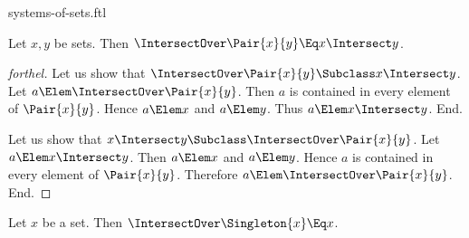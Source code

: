 \documentclass{stex}
\begin{document}
\begin{smodule}{systems-of-sets.ftl}
\begin{proposition*}[forthel]
  Let $x, y$ be sets.
  Then $\IntersectOver \Pair{x}{y} \Eq x \Intersect y$.
\end{proposition*}
\begin{proof}[forthel]
  Let us show that $\IntersectOver \Pair{x}{y} \Subclass x \Intersect y$.
    Let $a \Elem \IntersectOver \Pair{x}{y}$.
    Then $a$ is contained in every element of $\Pair{x}{y}$.
    Hence $a \Elem x$ and $a \Elem y$.
    Thus $a \Elem x \Intersect y$.
  End.

  Let us show that $x \Intersect y \Subclass \IntersectOver \Pair{x}{y}$.
    Let $a \Elem x \Intersect y$.
    Then $a \Elem x$ and $a \Elem y$.
    Hence $a$ is contained in every element of $\Pair{x}{y}$.
    Therefore $a \Elem \IntersectOver \Pair{x}{y}$.
  End.
\end{proof}

\begin{proposition*}[forthel]
  Let $x$ be a set.
  Then $\IntersectOver \Singleton{x} \Eq x$.
\end{proposition*}

\end{smodule}
\end{document}
